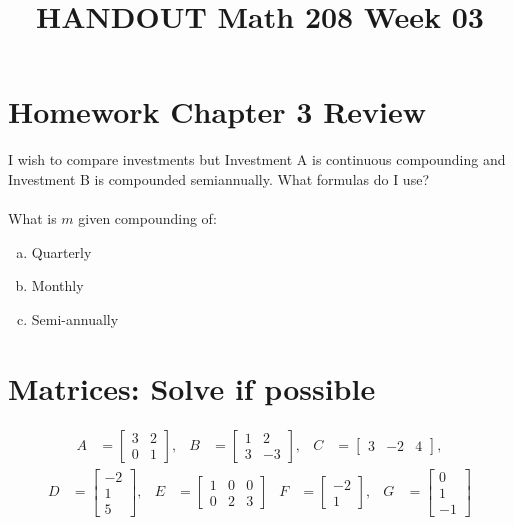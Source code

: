 \documentclass[14pt]{extarticle}
\title{\vspace{-5ex}HANDOUT Math 208 Week 03}
\date{\vspace{-10ex}}
\begin{document}
\maketitle	
\section*{Homework  Chapter 3 Review}
I wish to compare investments but Investment A is continuous compounding and Investment B is compounded semiannually. What formulas do I use?
\\\\
What is $m$ given compounding of:
\begin{multicols}{3}
	\begin{enumerate}[(a)]
		\item Quarterly
		\item Monthly
		\item Semi-annually
	\end{enumerate}
\end{multicols}

\section*{Matrices: Solve if possible}
\begin{align*}
	A &= \begin{bmatrix}
		3 & 2  \\
		0 & 1 
	\end{bmatrix},
	& B &= \begin{bmatrix}
		1 & 2 \\
		3 & -3
	\end{bmatrix},
	& C &= \begin{bmatrix}
		3 & -2 & 4
	\end{bmatrix},
\end{align*}
\begin{align*}
	D &= \begin{bmatrix}
		-2 \\
		1 \\
		5
	\end{bmatrix},
	& E &= \begin{bmatrix}
		1 & 0 & 0 \\
		0 & 2 & 3
	\end{bmatrix}
	& F &= \begin{bmatrix}
		-2 \\
		1 
	\end{bmatrix},
	& G &= \begin{bmatrix}
		0 \\
		1 \\
		-1
	\end{bmatrix}
\end{align*}
\end{document}
